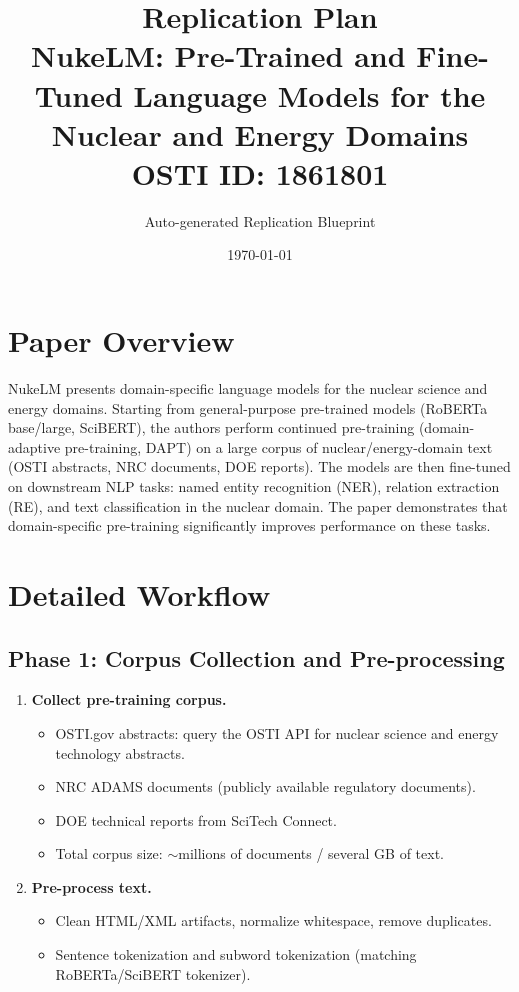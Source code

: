 \documentclass[11pt,a4paper]{article}
\title{\textbf{Replication Plan}\\[0.5em]
\large NukeLM: Pre-Trained and Fine-Tuned Language Models for the Nuclear and Energy Domains\\[0.3em]
\normalsize OSTI ID: 1861801}
\author{Auto-generated Replication Blueprint}
\date{\today}
\begin{document}
\maketitle
\tableofcontents
\newpage

\section{Paper Overview}
NukeLM presents domain-specific language models for the nuclear science and energy domains. Starting from general-purpose pre-trained models (RoBERTa base/large, SciBERT), the authors perform continued pre-training (domain-adaptive pre-training, DAPT) on a large corpus of nuclear/energy-domain text (OSTI abstracts, NRC documents, DOE reports). The models are then fine-tuned on downstream NLP tasks: named entity recognition (NER), relation extraction (RE), and text classification in the nuclear domain. The paper demonstrates that domain-specific pre-training significantly improves performance on these tasks.

\section{Detailed Workflow}

\subsection{Phase 1: Corpus Collection and Pre-processing}
\begin{enumerate}[label=\textbf{1.\arabic*}]
  \item \textbf{Collect pre-training corpus.}
    \begin{itemize}
      \item OSTI.gov abstracts: query the OSTI API for nuclear science and energy technology abstracts.
      \item NRC ADAMS documents (publicly available regulatory documents).
      \item DOE technical reports from SciTech Connect.
      \item Total corpus size: $\sim$millions of documents / several GB of text.
    \end{itemize}
  \item \textbf{Pre-process text.}
    \begin{itemize}
      \item Clean HTML/XML artifacts, normalize whitespace, remove duplicates.
      \item Sentence tokenization and subword tokenization (matching RoBERTa/SciBERT tokenizer).
    \end{itemize}
\end{enumerate}
\end{document}

